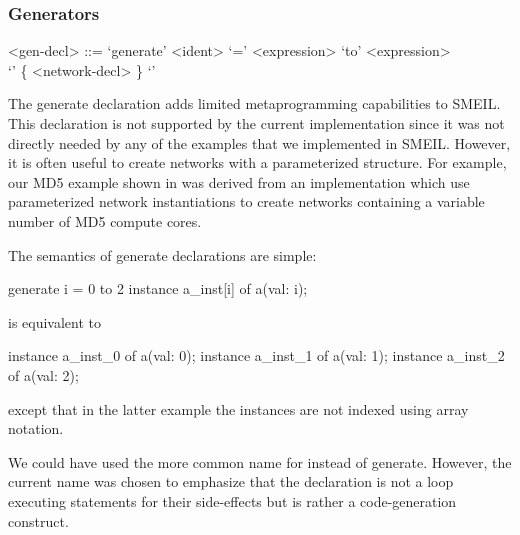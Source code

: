 \subsubsection{Generators}
\begin{grammar}
  <gen-decl> ::= `generate' <ident> `=' <expression> `to' <expression> \\ `{' \{ <network-decl> \} `}'
\end{grammar}
The {\ttfamily generate} declaration adds limited metaprogramming capabilities
to SMEIL. This declaration is not supported by the current implementation since
it was not directly needed by any of the examples that we implemented in
SMEIL. However, it is often useful to create networks with a parameterized
structure. For example, our MD5 example shown in  was derived from
an implementation which use parameterized network instantiations to create
networks containing a variable number of MD5 compute cores.

The semantics of {\ttfamily generate} declarations are simple:
\begin{smeilcode}
generate i = 0 to 2 {
  instance a_inst[i] of a(val: i);
}
\end{smeilcode}
is equivalent to
\begin{smeilcode}
instance a_inst_0 of a(val: 0);
instance a_inst_1 of a(val: 1);
instance a_inst_2 of a(val: 2);
\end{smeilcode}
except that in the latter example the instances are not indexed using array
notation.

We could have used the more common name {\ttfamily for} instead of {\ttfamily
  generate}. However, the current name was chosen to emphasize that the
declaration is not a loop executing statements for their side-effects but is
rather a code-generation construct.



